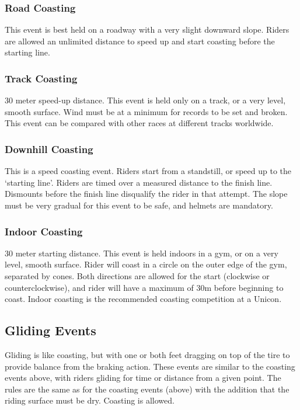 \subsubsection{Road Coasting}

This event is best held on a roadway with a very slight downward slope.
Riders are allowed an unlimited distance to speed up and start coasting before the starting line.

\subsubsection{Track Coasting \label{subsubsec:track-field_alternate-optional-fun-events_coasting_track-coasting}}
30 meter speed-up distance.
This event is held only on a track, or a very level, smooth surface.
Wind must be at a minimum for records to be set and broken.
This event can be compared with other races at different tracks worldwide.

\subsubsection{Downhill Coasting}
This is a speed coasting event.
Riders start from a standstill, or speed up to the `starting line'.
Riders are timed over a measured distance to the finish line.
Dismounts before the finish line disqualify the rider in that attempt.
The slope must be very gradual for this event to be safe, and helmets are mandatory.

\subsubsection{Indoor Coasting}
30 meter starting distance.
This event is held indoors in a gym, or on a very level, smooth surface.
Rider will coast in a circle on the outer edge of the gym, separated by cones.
Both directions are allowed for the start (clockwise or counterclockwise), and rider will have a maximum of 30m before beginning to coast.
Indoor coasting is the recommended coasting competition at a Unicon.

\subsection{Gliding Events}

Gliding is like coasting, but with one or both feet dragging on top of the tire to provide balance from the braking action.
These events are similar to the coasting events above, with riders gliding for time or distance from a given point.
The rules are the same as for the coasting events (above) with the addition that the riding surface must be dry.
Coasting is allowed.

